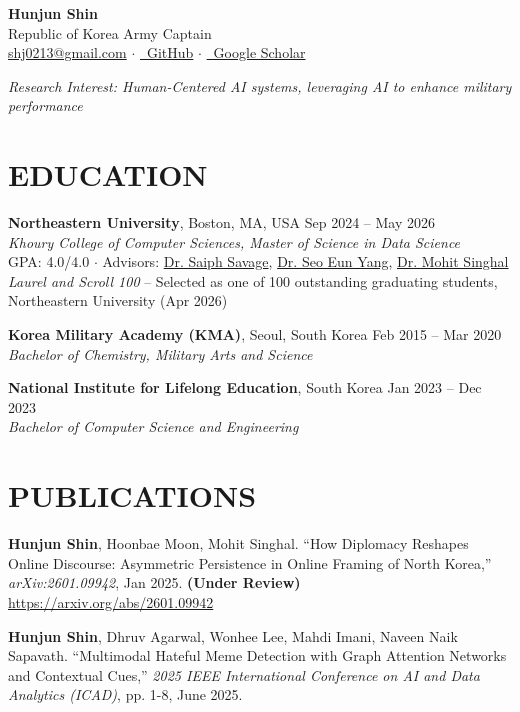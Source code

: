 \documentclass[11pt,a4paper]{article}
\begin{document}
\begin{center}
    {\LARGE\bfseries Hunjun Shin}\\[4pt]
    Republic of Korea Army Captain\\[4pt]
    \href{mailto:shj0213@gmail.com}{shj0213@gmail.com} $\cdot$
    \href{https://github.com/Shinhunjun}{\faGithub\ GitHub} $\cdot$
    \href{https://scholar.google.com/citations?user=_5BJbWMAAAAJ}{\faGraduationCap\ Google Scholar}
\end{center}

\vspace{-5pt}
\textit{Research Interest: Human-Centered AI systems, leveraging AI to enhance military performance}

\section{EDUCATION}

\textbf{Northeastern University}, Boston, MA, USA \hfill Sep 2024 -- May 2026\\
\textit{Khoury College of Computer Sciences, Master of Science in Data Science}\\
GPA: 4.0/4.0 $\cdot$ Advisors: \href{https://www.saiph.org/}{Dr. Saiph Savage}, \href{https://www.seoeunyang.com/}{Dr. Seo Eun Yang}, \href{https://msinghal10.github.io/}{Dr. Mohit Singhal}\\
\textit{Laurel and Scroll 100} -- Selected as one of 100 outstanding graduating students, Northeastern University (Apr 2026)

\textbf{Korea Military Academy (KMA)}, Seoul, South Korea \hfill Feb 2015 -- Mar 2020\\
\textit{Bachelor of Chemistry, Military Arts and Science}

\textbf{National Institute for Lifelong Education}, South Korea \hfill Jan 2023 -- Dec 2023\\
\textit{Bachelor of Computer Science and Engineering}

\section{PUBLICATIONS}

\begin{enumerate}[leftmargin=1.5em, label={[\arabic*]}]
    \item \textbf{Hunjun Shin}, Hoonbae Moon, Mohit Singhal. ``How Diplomacy Reshapes Online Discourse: Asymmetric Persistence in Online Framing of North Korea,'' \textit{arXiv:2601.09942}, Jan 2025. \textbf{(Under Review)}\\
    \url{https://arxiv.org/abs/2601.09942}

    \item \textbf{Hunjun Shin}, Dhruv Agarwal, Wonhee Lee, Mahdi Imani, Naveen Naik Sapavath. ``Multimodal Hateful Meme Detection with Graph Attention Networks and Contextual Cues,'' \textit{2025 IEEE International Conference on AI and Data Analytics (ICAD)}, pp. 1-8, June 2025.
\end{enumerate}
\end{document}
